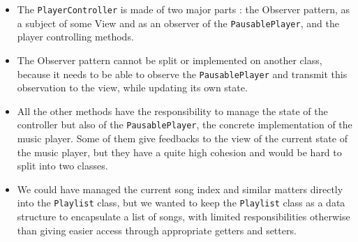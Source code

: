 \documentclass{report}
\begin{document}
\begin{itemize}
\item The \texttt{PlayerController} is made of two major parts : the Observer pattern, as a subject of some View and as an observer of the \texttt{PausablePlayer}, and the player controlling methods.
\item The Observer pattern cannot be split or implemented on another class, because it needs to be able to  observe the \texttt{PausablePlayer} and transmit this observation to the view, while updating its own state.
\item All the other methods have the responsibility to manage the state of the controller but also of the \texttt{PausablePlayer}, the concrete implementation of the music player. Some of them give feedbacks to the view of the current state of the music player, but they have a quite high cohesion and would be hard to split into two classes.
\item We could have managed the current song index and similar matters directly into the \texttt{Playlist} class, but we wanted to keep the \texttt{Playlist} class as a data structure to encapsulate a list of songs, with limited responsibilities otherwise than giving easier access through appropriate getters and setters.
\end{itemize}

\end{document}
